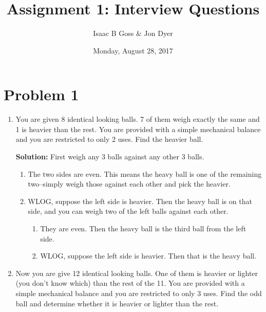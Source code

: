 \documentclass{article}
\author{Isaac B Goss \& Jon Dyer}
\title{Assignment 1: Interview Questions}
\date{Monday, August 28, 2017}
\providecommand{\soln}{\textbf{Solution: }}
\begin{document}
\maketitle

    \section*{Problem 1}
    
    \begin{enumerate}[label=\Alph*.]
        \item You are given 8 identical looking balls. 7 of them weigh exactly the same
        and 1 is heavier than the rest. You are provided with a simple mechanical
        balance and you are restricted to only 2 uses. Find the heavier ball.
        
            \soln First weigh any 3 balls against any other 3 balls.
        
            \begin{enumerate}[label=\textbf{Case \arabic*.}]
                \item The two sides are even.
                This means the heavy ball is one of the remaining two--simply weigh those against each other and pick the heavier.
                
                \item WLOG, suppose the left side is heavier. 
                Then the heavy ball is on that side, and you can weigh two of the left balls against each other.
                
                \begin{enumerate}[label=(\alph*)]
                    \item They are even. Then the heavy ball is the third ball from the left side.
                    \item WLOG, suppose the left side is heavier. Then that is the heavy ball.
                \end{enumerate}
            \end{enumerate}
        
        
        \item Now you are give 12 identical looking balls. One of them is heavier or lighter
        (you don’t know which) than the rest of the 11. You are provided with a
        simple mechanical balance and you are restricted to only 3 uses. Find the
        odd ball and determine whether it is heavier or lighter than the rest.
        

\end{enumerate}
\end{document}
